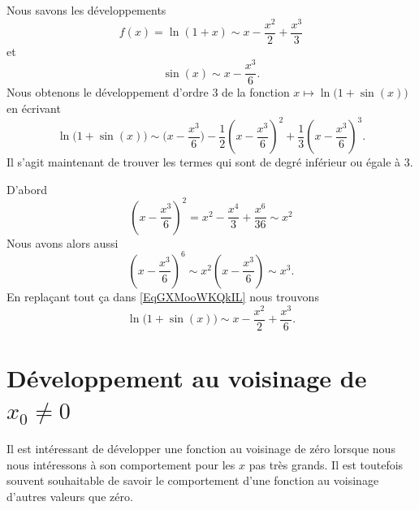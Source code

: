 \begin{example}
    Nous savons les développements
    \begin{equation}
        f(x)=\ln(1+x)\sim x-\frac{ x^2 }{ 2 }+\frac{ x^3 }{ 3 }
    \end{equation}
    et
    \begin{equation}
        \sin(x)\sim x-\frac{ x^3 }{ 6 }.
    \end{equation}
    Nous obtenons le développement d'ordre \( 3\) de la fonction \( x\mapsto \ln\big( 1+\sin(x) \big)\) en écrivant
    \begin{equation}    \label{EqGXMooWKQkIL}
        \ln\big( 1+\sin(x) \big)\sim \big( x-\frac{ x^3 }{ 6 } \big)-\frac{ 1 }{2}\left( x-\frac{ x^3 }{ 6 } \right)^2+\frac{1}{ 3 }\left( x-\frac{ x^3 }{ 6 } \right)^3.
    \end{equation}
    Il s'agit maintenant de trouver les termes qui sont de degré inférieur ou égale à \( 3\).

    D'abord
    \begin{equation}
        \left( x-\frac{ x^3 }{ 6 } \right)^2=x^2-\frac{ x^4 }{ 3 }+\frac{ x^6 }{ 36 }\sim x^2
    \end{equation}
    Nous avons alors aussi
    \begin{equation}
        \left( x-\frac{ x^3 }{ 6 } \right)^6\sim x^2\left( x-\frac{ x^3 }{ 6 } \right)\sim x^3.
    \end{equation}
    En replaçant tout ça dans \eqref{EqGXMooWKQkIL} nous trouvons
    \begin{equation}
        \ln\big( 1+\sin(x) \big)\sim x-\frac{ x^2 }{2}+\frac{ x^3 }{ 6 }.
    \end{equation}
\end{example}

\section{Développement au voisinage de $x_0\neq 0$}

Il est intéressant de développer une fonction au voisinage de zéro lorsque nous nous intéressons à son comportement pour les \( x\) pas très grands. Il est toutefois souvent souhaitable de savoir le comportement d'une fonction au voisinage d'autres valeurs que zéro.

